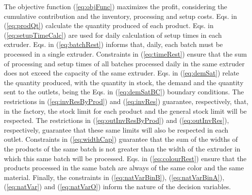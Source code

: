 The objective function (\ref{eq:objFunc}) maximizes the profit, considering the cumulative contribution and the inventory, processing and setup costs. Eqs. in (\ref{eq:prodQt}) calculate the quantity produced of each product. Eqs. in (\ref{eq:setupTimeCalc}) are used for daily calculation of setup times in each extruder. Eqs. in (\ref{eq:batchRest}) informs that, daily, each batch must be processed in a single extruder. Constraints in (\ref{eq:timeRest}) ensure that the sum of processing and setup times of all batches processed daily in the same extruder does not exceed the capacity of the same extruder. Eqs. in (\ref{eq:demSat}) relate the quantity produced, with the quantity in stock, the demand and the quantity sent to the outlets, being the Eqs. in (\ref{eq:demSatBC}) boundary conditions. The restrictions in (\ref{eq:invResByProd}) and (\ref{eq:invRes}) guarantee, respectively, that, in the factory, the stock limit for each product and the general stock limit will be respected.  The restrictions in (\ref{eq:outInvResByProd}) and (\ref{eq:outInvRes}), respectively, guarantee that these same limits will also be respected in each outlet. Constraints in (\ref{eq:widthCap}) guarantee that the sum of the widths of the products of the same batch is not greater than the width of the extruder in which this same batch will be processed. Eqs. in (\ref{eq:colourRest}) ensure that the products processed in the same batch are always of the same color and the same material. Finally, the constraints in (\ref{eq:natVarBinB}), (\ref{eq:natVarBinA}), (\ref{eq:natVar}) and (\ref{eq:natVarO}) inform the nature of the decision variables.


